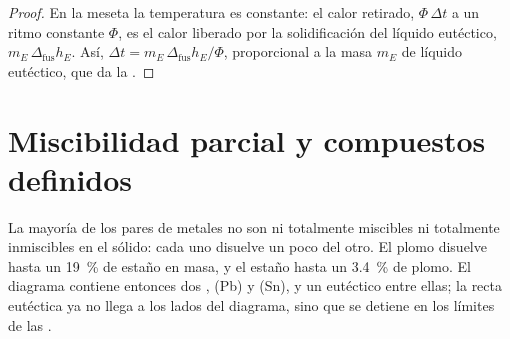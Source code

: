 \begin{proof}
En la meseta la temperatura es constante: el calor retirado, $\Phi\,\Delta t$
a un ritmo constante $\Phi$, es el calor liberado por la solidificación del
líquido eutéctico, $m_E\,\Delta_{\text{fus}}h_E$. Así, $\Delta t = m_E\,\Delta_{\text{fus}}h_E/
\Phi$, proporcional a la masa $m_E$ de líquido eutéctico, que da la .
\end{proof}

\section{Miscibilidad parcial y compuestos definidos}

La mayoría de los pares de metales no son ni totalmente miscibles ni totalmente inmiscibles en el
sólido: cada uno disuelve un poco del otro. El plomo disuelve hasta un 19~\% de estaño
en masa, y el estaño hasta un 3.4~\% de plomo. El diagrama contiene entonces dos , (Pb) y (Sn), y un eutéctico entre ellas; la recta eutéctica ya
no llega a los lados del diagrama, sino que se detiene en los límites de las .

